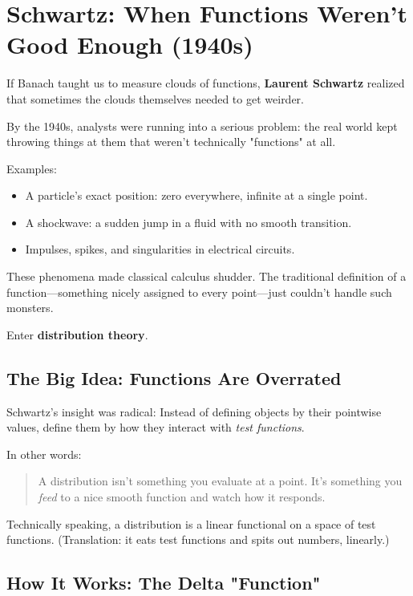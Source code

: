 \section{Schwartz: When Functions Weren’t Good Enough (1940s)}

If Banach taught us to measure clouds of functions, \textbf{Laurent Schwartz} realized that sometimes the clouds themselves needed to get weirder.

By the 1940s, analysts were running into a serious problem:  
the real world kept throwing things at them that weren’t technically "functions" at all.

Examples:
\begin{itemize}
    \item A particle's exact position: zero everywhere, infinite at a single point.
    \item A shockwave: a sudden jump in a fluid with no smooth transition.
    \item Impulses, spikes, and singularities in electrical circuits.
\end{itemize}

These phenomena made classical calculus shudder.  
The traditional definition of a function—something nicely assigned to every point—just couldn’t handle such monsters.

Enter \textbf{distribution theory}.

\subsection*{The Big Idea: Functions Are Overrated}

Schwartz's insight was radical:  
Instead of defining objects by their pointwise values, define them by how they interact with \textit{test functions}.

In other words:

\begin{quote}
    A distribution isn’t something you evaluate at a point.  
    It’s something you \textit{feed} to a nice smooth function and watch how it responds.
\end{quote}

\smallskip

Technically speaking, a distribution is a linear functional on a space of test functions.  
(Translation: it eats test functions and spits out numbers, linearly.)

\subsection*{How It Works: The Delta "Function"}

